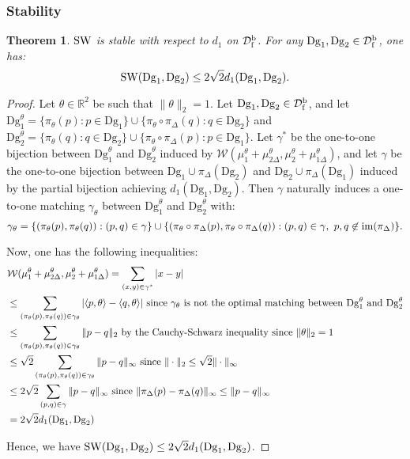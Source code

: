 \documentclass[11pt]{article}
\newcommand{\R}{\mathbb{R}}
\newcommand{\Dg}{\mathrm{Dg}}
\newcommand{\SW}{{\rm SW}}
\newcommand{\SpfbD}{{\mathcal D}_{\rm f}^{\rm b}}
\newtheorem{thm}{Theorem}[section]
\begin{document}
\subsubsection{Stability}

\begin{thm}\label{th:stab}
$\SW$  is stable with respect to $d_1$ on $\SpfbD$.
For any $\Dg_1,\Dg_2\in \SpfbD$, one has: $$\SW(\Dg_1,\Dg_2)\leq 2\sqrt{2}d_1(\Dg_1,\Dg_2).$$
\end{thm}

\begin{proof}
Let $\theta\in\R^2$ be such that $\|\theta\|_2=1$. Let $\Dg_1,\Dg_2\in \SpfbD$, and
let $\Dg_1^\theta = \{\pi_\theta(p):p\in \Dg_1\}\cup\{\pi_\theta\circ\pi_\Delta(q):q\in \Dg_2\}$ and 
$\Dg_2^\theta=\{\pi_\theta(q):q\in \Dg_2\}\cup\{\pi_\theta\circ\pi_\Delta(p):p\in \Dg_1\}$. Let $\gamma^*$ be the one-to-one bijection between $\Dg_1^\theta$ and $\Dg_2^\theta$
induced by $\mathcal W(\mu_1^\theta+\mu_{2\Delta}^\theta,\mu_2^\theta+\mu_{1\Delta}^\theta)$, and
let $\gamma$ be the 
one-to-one bijection between $\Dg_1\cup\pi_\Delta(\Dg_2)$ and $\Dg_2\cup\pi_\Delta(\Dg_1)$
induced by the partial bijection achieving $d_1(\Dg_1,\Dg_2)$.
Then $\gamma$ naturally induces a one-to-one matching $\gamma_\theta$
between $\Dg_1^\theta$ and $\Dg_2^\theta$ with:
$$\gamma_\theta=\{(\pi_\theta(p),\pi_\theta(q)):(p,q)\in\gamma\}\cup
\{(\pi_\theta\circ\pi_\Delta(p),\pi_\theta\circ\pi_\Delta(q)):(p,q)\in\gamma,\ p,q\not\in{\rm im}(\pi_\Delta)\}.$$

Now, one has the following inequalities:
\begin{align}
&\mathcal W(\mu_1^\theta+\mu_{2\Delta}^\theta,\mu_2^\theta+\mu_{1\Delta}^\theta) = \sum_{(x,y)\in\gamma^*} |x-y|\nonumber\\
&\leq \sum_{(\pi_\theta(p),\pi_\theta(q))\in\gamma_\theta} |\langle p,\theta\rangle-\langle q, \theta\rangle|
{\rm\ since\ }
\gamma_\theta{\rm\ is\ not\ the\ optimal\ matching\ between\ }\Dg_1^\theta{\rm\ and\ }\Dg_2^\theta\nonumber\\
&\leq \sum_{(\pi_\theta(p),\pi_\theta(q))\in\gamma_\theta} \|p-q\|_2\text{ by the Cauchy-Schwarz inequality since }\|\theta\|_2=1\nonumber\\
&\leq \sqrt{2}\sum_{(\pi_\theta(p),\pi_\theta(q))\in\gamma_\theta} \|p-q\|_\infty{\rm\ since\ }\|\cdot\|_2\leq\sqrt{2}\|\cdot\|_\infty\nonumber\\
&\leq 2\sqrt{2}\sum_{(p,q)\in\gamma} \|p-q\|_\infty{\rm\ since\ }\|\pi_\Delta(p)-\pi_\Delta(q)\|_\infty \leq \|p-q\|_\infty\nonumber\\
&= 2\sqrt{2}d_1(\Dg_1,\Dg_2)\nonumber
\end{align}

Hence, we have
$\SW(\Dg_1,\Dg_2)\leq 2\sqrt{2}d_1(\Dg_1,\Dg_2)$.
\end{proof}
\end{document}
